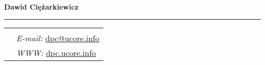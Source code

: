 \documentclass[10pt]{article}
\newcommand{\makeheading}[1]%
        {\hspace*{-\marginparsep minus \marginparwidth}%
         \begin{minipage}[t]{\textwidth+\marginparwidth+\marginparsep}%
                {\large \bfseries #1}\hfill {\scriptsize }\\[-0.15\baselineskip]%
                 \rule{\columnwidth}{1pt}%
         \end{minipage}
}
\renewcommand{\section}[2]%
        {\pagebreak[2]\vspace{1.4\baselineskip}%
         \phantomsection\addcontentsline{toc}{section}{#1}%
         \hspace{0in}%
         \marginpar{
         \raggedright \scshape #1}#2}
\begin{document}
\makeheading{Dawid Ciężarkiewicz}


%
%
%
\newlength{\rcollength}\setlength{\rcollength}{1.85in}%
%
\begin{tabular}[t]{@{}p{\textwidth-\rcollength}p{\rcollength}}

&
}

\\

& \textit{E-mail:}
\href{mailto:dpc@ucore.info}{dpc@ucore.info}\\
   & \textit{WWW:}
\href{http://dpc.ucore.info/}{dpc.ucore.info}\\
\end{tabular}


%
\end{document}
